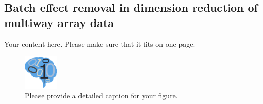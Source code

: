 \documentclass[simplex.tex]{subfiles}
\begin{document}
\subsection{Batch effect removal in dimension reduction of multiway array data}
Your content here. Please make sure that it fits on one page.

\begin{figure}[!h]
\begin{cframed}
\centering
\includegraphics[width=0.15\textwidth]{neurodata_small.png}
\caption{Please provide a detailed caption for your figure.}
\label{fig:meda}
\end{cframed}
\end{figure}
%
%
%
\end{document}
